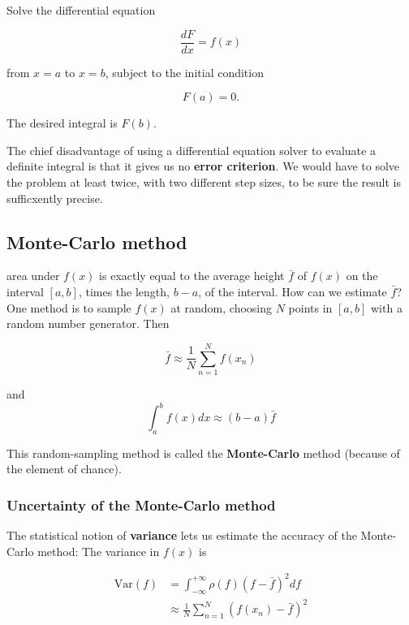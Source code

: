 Solve the differential equation

\begin{equation}
\frac{dF}{dx} = f(x)
\end{equation}

from $x = a$ to $x = b$, subject to the initial condition

\begin{equation*}
F(a) = 0.
\end{equation*}

The desired integral is $F(b)$.

The chief disadvantage of using a differential equation solver to evaluate a definite integral is that it gives us no \textbf{error criterion}. We would have to solve the problem at least twice, with two different step sizes, to be sure the result is sufficxently precise.

\subsection{Monte-Carlo method}
 area under $f(x)$ is exactly equal to the average height $\bar{f}$ of $f(x)$ on the interval $[a, b]$, times the length, $b-a$, of the interval. How can we estimate $\bar{f}$? One method is to sample $f(x)$ at random, choosing $N$ points in $[a,b]$ with a random number generator. Then

\begin{equation}\label{eq:08_05}
\bar{f} \approx \frac{1}{N} \sum_{n=1}^{N} f(x_n)
\end{equation}

and
\begin{equation}
\int_{a}^{b} f(x) dx \approx (b-a)\bar{f}
\end{equation}

This random-sampling method is called the \textbf{Monte-Carlo} method (because of the element of chance).

\subsubsection{Uncertainty of the Monte-Carlo method}
The statistical notion of \textbf{variance} lets us estimate the accuracy of the Monte-Carlo method: The variance in $f(x)$ is

\begin{equation}
    \begin{split}
    \text{Var}(f) &= \int_{-\infty}^{+\infty} \rho(f) \left(f- \bar{f}\right)^2 df \\
    & \approx \frac{1}{N} \sum_{n=1}^{N} \left(f(x_n) - \bar{f}\right)^2
    \end{split}
\end{equation}

